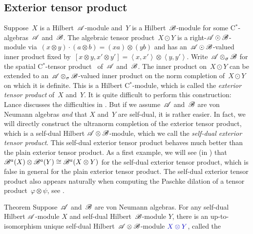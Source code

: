 \subsection{Exterior tensor product}
\begin{parsec}%
\begin{point}%
Suppose~$X$ is a Hilbert~$\mathscr{A}$-module
    and~$Y$ is a Hilbert~$\mathscr{B}$-module
    for some C$^*$-algebras~$\mathscr{A}$ and~$\mathscr{B}$.
The algebraic tensor product~$X \odot Y$
    is a right-$\mathscr{A} \odot \mathscr{B}$-module
    via~$(x\otimes y)\cdot (a\otimes b) = (xa) \otimes (yb)$
    and has an~$\mathscr{A} \odot \mathscr{B}$-valued inner
    product fixed by~$[x\otimes y, x'\otimes y']
        = \left<x,x'\right> \otimes \left<y,y'\right>$.
Write~$\mathscr{A} \otimes_\sigma \mathscr{B}$ for the spatial
    C$^*$-tensor product~\cite[\S11.3]{kr} of~$\mathscr{A}$ and~$\mathscr{B}$.
The inner product on~$X \odot Y$ can be extended
    to an~$\mathscr{A} \otimes_\sigma \mathscr{B}$-valued inner product
    on the norm completion of~$X \odot Y$
    on which it is definite. \cite{lance}
This is a Hilbert C$^*$-module,
    which is called the \emph{exterior tensor product} of~$X$ and~$Y$.
It is quite difficult to perform this construction:
    Lance discusses the difficulties in \cite[Ch.~4]{lance}.
But if we assume~$\mathscr{A}$ and~$\mathscr{B}$ are von Neumann algebras
    \emph{and} that $X$ and~$Y$ are self-dual,
    it is rather easier.
In fact, we will directly construct the ultranorm completion
    of the exterior tensor product,
    which is a self-dual Hilbert $\mathscr{A} \otimes \mathscr{B}$-module,
    which we call the \emph{self-dual exterior tensor product}.
This self-dual exterior tensor product
    behaves much better than the plain exterior tensor product.
    As a first example, we will see (in )
    that~$\mathscr{B}^a(X) \otimes \mathscr{B}^a(Y) \cong \mathscr{B}^a(X\otimes Y)$
        for the self-dual exterior tensor product,
        which is false in general for the plain exterior tensor product.
The self-dual exterior tensor product also appears naturally
    when computing the Paschke dilation
    of a tensor product~$\varphi \otimes \psi$, see .
\end{point}
\begin{point}{Theorem}%
Suppose~$\mathscr{A}$ and~$\mathscr{B}$ are von Neumann algebras.
For any self-dual Hilbert $\mathscr{A}$-module $X$
    and self-dual Hilbert~$\mathscr{B}$-module $Y$,
    there is an up-to-isomorphism unique
    self-dual Hilbert~$\mathscr{A}\otimes \mathscr{B}$-module
    $\Define{X \otimes Y}$, called the %

\end{point}
\end{parsec}
